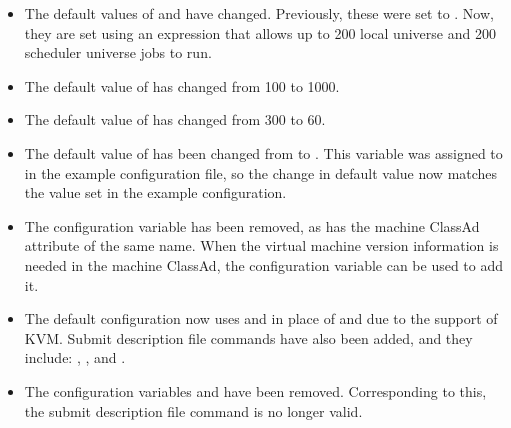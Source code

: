\begin{itemize}
\item The default values of  and
   have changed.  Previously,
  these were set to .  Now, they are set using an expression
  that allows
  up to 200 local universe and 200 scheduler universe jobs to run.

\item The default value of
   has
  changed from 100 to 1000.

\item The default value of 
   has changed from 300 to 60.

\item The default value of  has been
  changed from  to .  This variable
  was assigned to  in the example configuration file, so
  the change in default value now matches the value set in the example
  configuration.

\item The configuration variable  has been removed,
as has the machine ClassAd attribute of the same name.
When the virtual machine version information is needed in the machine ClassAd,
the configuration variable  can be used to
add it.
 
\item The default configuration now uses
   and  in place of
   and  due to the
  support of KVM. 
  Submit description file commands have also been added, and they include:
  , ,
   and .

\item The configuration variables 
  and  have been removed.
  Corresponding to this, the submit description file command
   is no longer valid.

\end{itemize}


